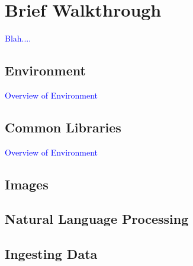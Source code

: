 \chapter{Brief Walkthrough}

\textcolor{blue}{Blah....}

\section{Environment}

\textcolor{blue}{Overview of Environment}

















\section{Common Libraries}

\textcolor{blue}{Overview of Environment}




\section{Images}



\section{Natural Language Processing}




\section{Ingesting Data}





